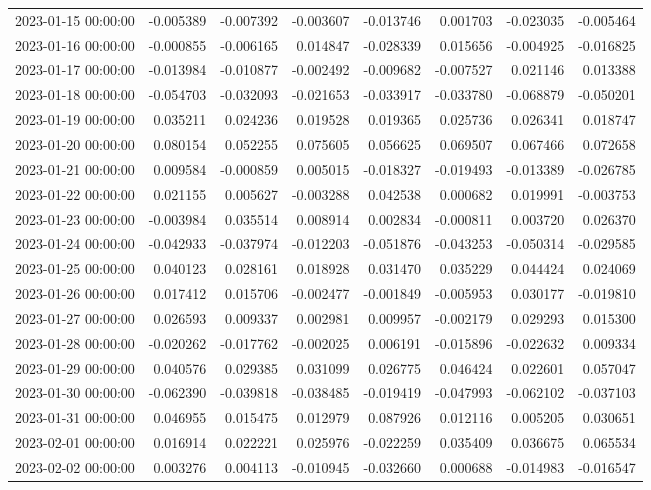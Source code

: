 \begin{tabular}{lrrrrrrr}
2023-01-15 00:00:00 & -0.005389 & -0.007392 & -0.003607 & -0.013746 & 0.001703 & -0.023035 & -0.005464 \\
2023-01-16 00:00:00 & -0.000855 & -0.006165 & 0.014847 & -0.028339 & 0.015656 & -0.004925 & -0.016825 \\
2023-01-17 00:00:00 & -0.013984 & -0.010877 & -0.002492 & -0.009682 & -0.007527 & 0.021146 & 0.013388 \\
2023-01-18 00:00:00 & -0.054703 & -0.032093 & -0.021653 & -0.033917 & -0.033780 & -0.068879 & -0.050201 \\
2023-01-19 00:00:00 & 0.035211 & 0.024236 & 0.019528 & 0.019365 & 0.025736 & 0.026341 & 0.018747 \\
2023-01-20 00:00:00 & 0.080154 & 0.052255 & 0.075605 & 0.056625 & 0.069507 & 0.067466 & 0.072658 \\
2023-01-21 00:00:00 & 0.009584 & -0.000859 & 0.005015 & -0.018327 & -0.019493 & -0.013389 & -0.026785 \\
2023-01-22 00:00:00 & 0.021155 & 0.005627 & -0.003288 & 0.042538 & 0.000682 & 0.019991 & -0.003753 \\
2023-01-23 00:00:00 & -0.003984 & 0.035514 & 0.008914 & 0.002834 & -0.000811 & 0.003720 & 0.026370 \\
2023-01-24 00:00:00 & -0.042933 & -0.037974 & -0.012203 & -0.051876 & -0.043253 & -0.050314 & -0.029585 \\
2023-01-25 00:00:00 & 0.040123 & 0.028161 & 0.018928 & 0.031470 & 0.035229 & 0.044424 & 0.024069 \\
2023-01-26 00:00:00 & 0.017412 & 0.015706 & -0.002477 & -0.001849 & -0.005953 & 0.030177 & -0.019810 \\
2023-01-27 00:00:00 & 0.026593 & 0.009337 & 0.002981 & 0.009957 & -0.002179 & 0.029293 & 0.015300 \\
2023-01-28 00:00:00 & -0.020262 & -0.017762 & -0.002025 & 0.006191 & -0.015896 & -0.022632 & 0.009334 \\
2023-01-29 00:00:00 & 0.040576 & 0.029385 & 0.031099 & 0.026775 & 0.046424 & 0.022601 & 0.057047 \\
2023-01-30 00:00:00 & -0.062390 & -0.039818 & -0.038485 & -0.019419 & -0.047993 & -0.062102 & -0.037103 \\
2023-01-31 00:00:00 & 0.046955 & 0.015475 & 0.012979 & 0.087926 & 0.012116 & 0.005205 & 0.030651 \\
2023-02-01 00:00:00 & 0.016914 & 0.022221 & 0.025976 & -0.022259 & 0.035409 & 0.036675 & 0.065534 \\
2023-02-02 00:00:00 & 0.003276 & 0.004113 & -0.010945 & -0.032660 & 0.000688 & -0.014983 & -0.016547 \\

\end{tabular}

